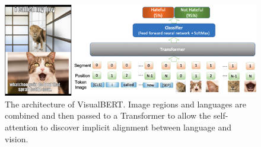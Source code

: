 \documentclass[10pt,twocolumn,letterpaper]{article}
\begin{document}
\begin{figure}
\begin{center}
\includegraphics[scale = 1]{Figure3}
\end{center}
   \caption{The architecture of VisualBERT. Image regions and languages are combined and then passed to a Transformer to allow the self-attention to discover implicit alignment between language and vision.}
\label{fig:architecture}
\end{figure}

\end{document}
